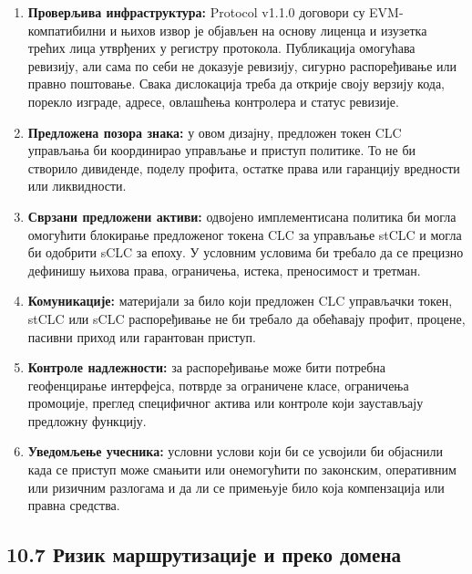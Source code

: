 \documentclass[11pt]{article}
\begin{document}
\begin{enumerate}[leftmargin=*]
\item \textbf{Проверљива инфраструктура:} Protocol v1.1.0 договори су EVM- компатибилни и њихов извор је објављен на основу лиценца и изузетка трећих лица утврђених у регистру протокола. Публикација омогућава ревизију, али сама по себи не доказује ревизију, сигурно распоређивање или правно поштовање. Свака дислокација треба да открије своју верзију кода, порекло изграде, адресе, овлашћења контролера и статус ревизије.
\item \textbf{Предложена позора знака:} у овом дизајну, предложен токен CLC управљања би координирао управљање и приступ политике. То не би створило дивиденде, поделу профита, остатке права или гаранцију вредности или ликвидности.
\item \textbf{Сврзани предложени активи:} одвојено имплементисана политика би могла омогућити блокирање предложеног токена CLC за управљање stCLC и могла би одобрити sCLC за епоху. У условним условима би требало да се прецизно дефинишу њихова права, ограничења, истека, преносимост и третман.
\item \textbf{Комуникације:} материјали за било који предложен CLC управљачки токен, stCLC или sCLC распоређивање не би требало да обећавају профит, процене, пасивни приход или гарантован приступ.
\item \textbf{Контроле надлежности:} за распоређивање може бити потребна геофенцирање интерфејса, потврде за ограничене класе, ограничења промоције, преглед специфичног актива или контроле који заустављају предложну функцију.
\item \textbf{Уведомљење учесника:} условни услови који би се усвојили би објаснили када се приступ може смањити или онемогућити по законским, оперативним или ризичним разлогама и да ли се примењује било која компензација или правна средства.
\end{enumerate}
\subsection*{10.7 Ризик маршрутизације и преко домена}
\end{document}
